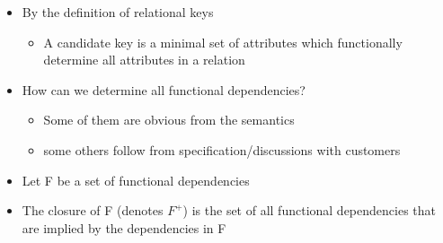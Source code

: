 \documentclass{article}[18pt]
\begin{document}
\begin{itemize}
	\item By the definition of relational keys
	\begin{itemize}
		\item A candidate key is a minimal set of attributes which functionally determine all attributes in a relation
	\end{itemize}
	\item How can we determine all functional dependencies?
	\begin{itemize}
		\item Some of them are obvious from the semantics
		\item some others follow from specification/discussions with customers
	\end{itemize}
	\item Let F be a set of functional dependencies
	\item The closure of F (denotes $F^+$) is the set of all functional dependencies that are implied by the dependencies in F
\end{itemize}
\end{document}
